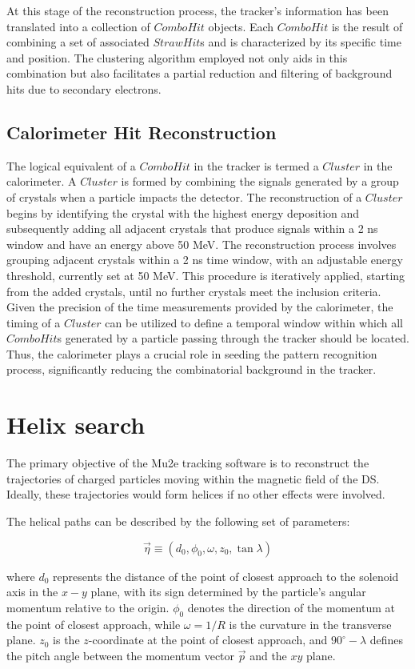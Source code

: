 At this stage of the reconstruction process, the tracker's information 
has been translated into a collection of $ComboHit$ objects. 
Each $ComboHit$ is the result of combining a set of associated 
$StrawHit$s and is characterized by its specific time and position. 
The clustering algorithm employed not only aids in this combination but also 
facilitates a partial reduction and filtering of background hits due to secondary electrons.


\subsection{Calorimeter Hit Reconstruction}
The logical equivalent of a $ComboHit$ in the tracker is termed a $Cluster$ in 
the calorimeter. A $Cluster$ is formed by combining the signals generated by a 
group of crystals when a particle impacts the detector. The reconstruction of a 
$Cluster$ begins by identifying the crystal with the highest energy deposition 
and subsequently adding all adjacent crystals that produce signals within a 
2 ns window and have an energy above 50 MeV.
The reconstruction process involves grouping 
adjacent crystals within a 2 ns time window, with an adjustable energy 
threshold, currently set at 50 MeV. This procedure is iteratively applied, 
starting from the added crystals, until no further crystals meet the inclusion 
criteria. Given the precision of the time measurements provided by the 
calorimeter, the timing of a $Cluster$ can be utilized to define a temporal 
window within which all $ComboHit$s generated by a particle passing through 
the tracker should be located. Thus, the calorimeter plays a crucial role in 
seeding the pattern recognition process, significantly reducing the 
combinatorial background in the tracker.


\section{Helix search}
The primary objective of the Mu2e tracking software 
is to reconstruct the trajectories of charged particles 
moving within the magnetic field of the DS. 
Ideally, these trajectories would form helices if no other effects were involved.

The helical paths can be described by the following set of parameters:

\[
\vec{\eta} \equiv (d_0, \phi_0, \omega, z_0, \tan \lambda)
\]

where $d_0$ represents the distance of the point of closest 
approach to the solenoid axis in the $x-y$ plane, with its 
sign determined by the particle's angular momentum relative 
to the origin. $\phi_0$ denotes the direction of the momentum 
at the point of closest approach, while $\omega = 1/R$ is the 
curvature in the transverse plane. $z_0$ is the $z$-coordinate 
at the point of closest approach, and $90^\circ - \lambda$ 
defines the pitch angle between the momentum vector $\vec{p}$ and the $xy$ plane.

